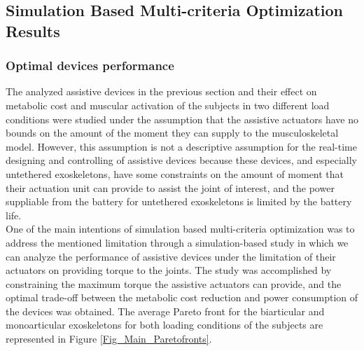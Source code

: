 \documentclass[10pt,letterpaper]{article}
\begin{document}
\subsection*{Simulation Based Multi-criteria Optimization Results}
\subsubsection*{Optimal devices performance}
The analyzed assistive devices in the previous section and their effect on metabolic cost and muscular activation of the subjects in two different load conditions were studied under the assumption that the assistive actuators have no bounds on the amount of the moment they can supply to the musculoskeletal model. However, this assumption is not a descriptive assumption for the real-time designing and controlling of assistive devices because these devices, and especially untethered exoskeletons, have some constraints on the amount of moment that their actuation unit can provide to assist the joint of interest, and the power suppliable from the battery for untethered exoskeletons is limited by the battery life. \\
One of the main intentions of simulation based multi-criteria optimization was to address the mentioned limitation through a simulation-based study in which we can analyze the performance of assistive devices under the limitation of their actuators on providing torque to the joints. 
The study was accomplished by constraining the maximum torque the assistive actuators can provide, and the optimal trade-off between the metabolic cost reduction and power consumption of the devices was obtained. The average Pareto front for the biarticular and monoarticular exoskeletons for both loading conditions of the subjects are represented in Figure \ref{Fig_Main_Paretofronts}.\\
\end{document}

